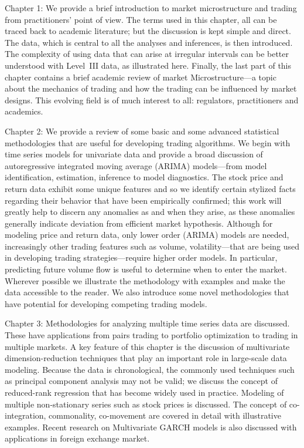 Chapter 1: We provide a brief introduction to market microstructure and trading from practitioners' point of view. The terms used in this chapter, all can be traced back to academic literature; but the discussion is kept simple and direct. The data, which is central to all the analyses and inferences, is then introduced. The complexity of using data that can arise at irregular intervals can be better understood with Level~III data, as illustrated here. Finally, the last part of this chapter contains a brief academic review of market Microstructure---a topic about the mechanics of trading and how the trading can be influenced by market designs. This evolving field is of much interest to all: regulators, practitioners and academics.


Chapter 2: We provide a review of some basic and some advanced statistical methodologies that are useful for developing trading algorithms. We begin with time series models for univariate data and provide a broad discussion of autoregressive integrated moving average (ARIMA) models---from model identification, estimation, inference to model diagnostics. The stock price and return data exhibit some unique features and so we identify certain stylized facts regarding their behavior that have been empirically confirmed; this work will greatly help to discern any anomalies as and when they arise, as these anomalies generally indicate deviation from efficient market hypothesis. Although for modeling price and return data, only lower order (ARIMA) models are needed, increasingly other trading features such as volume, volatility---that are being used in developing trading strategies---require higher order models. In particular, predicting future volume flow is useful to determine when to enter the market. Wherever possible we illustrate the methodology with examples and make the data accessible to the reader. We also introduce some novel methodologies that have potential for developing competing trading models.


Chapter 3: Methodologies for analyzing multiple time series data are discussed. These have applications from pairs trading to portfolio optimization to trading in multiple markets.  A key feature of this chapter is the discussion of multivariate dimension-reduction techniques that play an important role in large-scale data modeling. Because the data is chronological, the commonly used techniques such as principal component analysis may not be valid; we discuss the concept of reduced-rank regression that has become widely used in practice. Modeling of multiple non-stationary series such as stock prices is discussed. The concept of co-integration, commonality, co-movement are covered in detail with illustrative examples. Recent research on Multivariate GARCH models is also discussed with applications in foreign exchange market.


